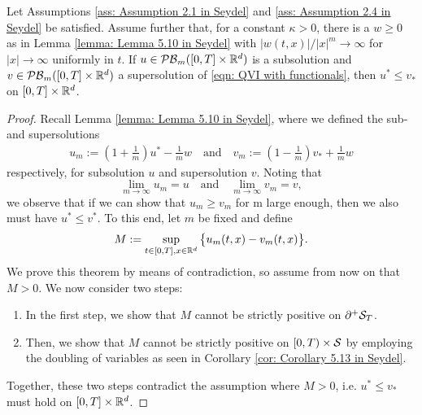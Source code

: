 \begin{theorem}
\label{trm: 5.14 in Seydel}
    Let Assumptions \ref{ass: Assumption 2.1 in Seydel} and \ref{ass: Assumption 2.4 in Seydel} be satisfied. Assume further that, for a constant $\kappa>0$, there is a $w \geq 0$ as in Lemma \ref{lemma: Lemma 5.10 in Seydel} with $|w(t,x)| / |x|^m \rightarrow \infty$ for $|x| \rightarrow \infty$ uniformly in $t$. If $u \in \mathcal{PB}_m([0,T] \times \mathbb{R}^d)$ is a subsolution and $v \in \mathcal{PB}_m([0,T] \times \mathbb{R}^d)$ a supersolution of \eqref{eqn: QVI with functionals}, then $u^* \leq v_*$ on $[0,T] \times \mathbb{R}^d$. 
\end{theorem}
\begin{proof}
    Recall Lemma \ref{lemma: Lemma 5.10 in Seydel}, where we defined the sub-and supersolutions
    \begin{align*}
        u_m := \left(1+\frac{1}{m}\right) u^* - \frac{1}{m} w \quad \text{and} \quad v_m := \left(1-\frac{1}{m}\right) v_* + \frac{1}{m} w
    \end{align*}
    respectively, for subsolution $u$ and supersolution $v$. Noting that 
    \begin{equation*}
        \lim_{m\rightarrow \infty} u_m = u \quad \text{and} \quad \lim_{m\rightarrow \infty} v_m = v,
    \end{equation*}
    we observe that if we can show that $u_m \geq v_m$ for m large enough, then we also must have $u^* \leq v^*$. To this end, let $m$ be fixed and define 
    \begin{equation*}
        M:= \sup_{t \in [0,T], x \in \mathbb{R}^d} \big\{u_m(t,x) - v_m(t,x) \big\}. 
    \end{equation*}
    We prove this theorem by means of contradiction, so assume from now on that $M>0$. We now consider two steps:
    \begin{enumerate}[label=\textbf{Step \arabic*:}, leftmargin=*, labelsep=.6em]
        \item In the first step, we show that $M$ cannot be strictly positive on $\partial^+ \mathcal{S}_T$.
        \item Then, we show that $M$ cannot be strictly positive on $[0,T)\times \mathcal{S}$ by employing the doubling of variables as seen in Corollary \ref{cor: Corollary 5.13 in Seydel}.
    \end{enumerate}
    Together, these two steps contradict the assumption where $M>0$, i.e. $u^* \leq v_*$ must hold on $[0,T]\times \mathbb{R}^d$.


\end{proof}
